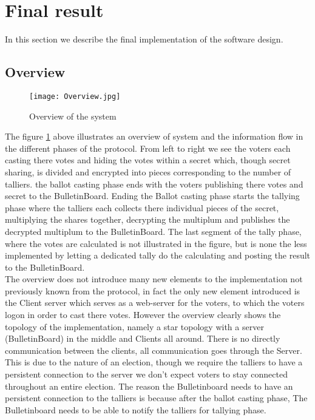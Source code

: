 \section{Final result}
In this section we describe the final implementation of the software design. 

\subsection{Overview}

\begin{figure}[H]
    \centering
    \texttt{[image: Overview.jpg]}
    \caption{Overview of the system}
    \label{fig:informal_overview}
\end{figure}

The figure \ref{fig:informal_overview} above illustrates an overview of system and the information flow in the different phases of the protocol. From left to right we see the voters each casting there votes and hiding the votes within a secret which, though secret sharing, is divided and encrypted into pieces corresponding to the number of talliers. the ballot casting phase ends with the voters publishing there votes and secret to the BulletinBoard. Ending the Ballot casting phase starts the tallying phase where the talliers each collects there individual pieces of the secret, multiplying the shares together, decrypting the multiplum and publishes the decrypted multiplum to the BulletinBoard. The last segment of the tally phase, where the votes are calculated is not illustrated in the figure, but is none the less implemented by letting a dedicated tally do the calculating and posting the result to the BulletinBoard. \\

\noindent
The overview does not introduce many new elements to the implementation not previously known from the protocol, in fact the only new element introduced is the Client server which serves as a web-server for the voters, to which the voters logon in order to cast there votes. However the overview clearly shows the topology of the implementation, namely a star topology with a server (BulletinBoard) in the middle and Clients all around. There is no directly communication between the clients, all communication goes through the Server. This is due to the nature of an election, though we require the talliers to have a persistent connection to the server we don't expect voters to stay connected throughout an entire election. The reason the Bulletinboard needs to have an persistent connection to the talliers is because after the ballot casting phase, The Bulletinboard needs to be able to notify the talliers for tallying phase.

